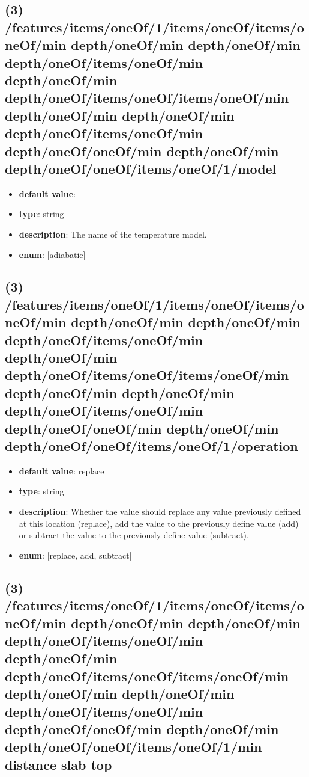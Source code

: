 \subsection{(3) /features/items/oneOf/1/items/oneOf/items/oneOf/min depth/oneOf/min depth/oneOf/min depth/oneOf/items/oneOf/min depth/oneOf/min depth/oneOf/items/oneOf/items/oneOf/min depth/oneOf/min depth/oneOf/min depth/oneOf/items/oneOf/min depth/oneOf/oneOf/min depth/oneOf/min depth/oneOf/oneOf/items/oneOf/1/model}
\begin{itemize}[leftmargin=3em]\item {\bf default value}: 
\item {\bf type}: string
\item {\bf description}: The name of the temperature model.
\item {\bf enum}: [adiabatic]\end{itemize}\subsection{(3) /features/items/oneOf/1/items/oneOf/items/oneOf/min depth/oneOf/min depth/oneOf/min depth/oneOf/items/oneOf/min depth/oneOf/min depth/oneOf/items/oneOf/items/oneOf/min depth/oneOf/min depth/oneOf/min depth/oneOf/items/oneOf/min depth/oneOf/oneOf/min depth/oneOf/min depth/oneOf/oneOf/items/oneOf/1/operation}
\begin{itemize}[leftmargin=3em]\item {\bf default value}: replace
\item {\bf type}: string
\item {\bf description}: Whether the value should replace any value previously defined at this location (replace), add the value to the previously define value (add) or subtract the value to the previously define value (subtract).
\item {\bf enum}: [replace, add, subtract]\end{itemize}\subsection{(3) /features/items/oneOf/1/items/oneOf/items/oneOf/min depth/oneOf/min depth/oneOf/min depth/oneOf/items/oneOf/min depth/oneOf/min depth/oneOf/items/oneOf/items/oneOf/min depth/oneOf/min depth/oneOf/min depth/oneOf/items/oneOf/min depth/oneOf/oneOf/min depth/oneOf/min depth/oneOf/oneOf/items/oneOf/1/min distance slab top}
